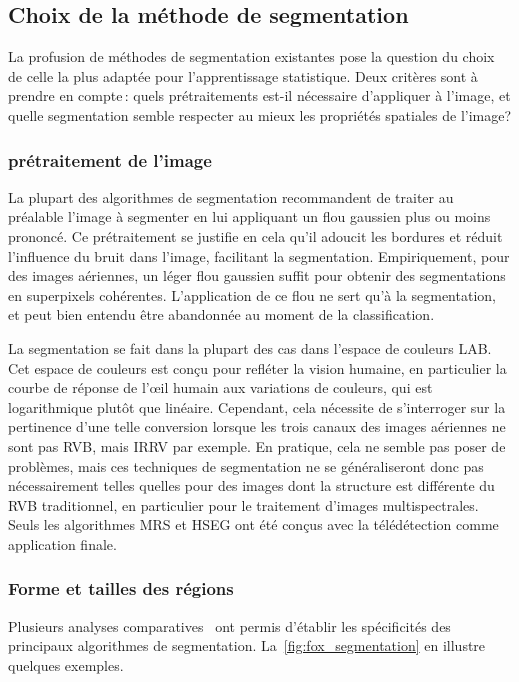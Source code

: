 \subsection{Choix de la méthode de segmentation}

La profusion de méthodes de segmentation existantes pose la question du choix de celle la plus adaptée pour l'apprentissage statistique. Deux critères sont à prendre en compte\,: quels prétraitements est-il nécessaire d'appliquer à l'image, et quelle segmentation semble respecter au mieux les propriétés spatiales de l'image?


\subsubsection{prétraitement de l'image}
La plupart des algorithmes de segmentation recommandent de traiter au préalable l'image à segmenter en lui appliquant un flou gaussien plus ou moins prononcé. Ce prétraitement se justifie en cela qu'il adoucit les bordures et réduit l'influence du bruit dans l'image, facilitant la segmentation. Empiriquement, pour des images aériennes, un léger flou gaussien suffit pour obtenir des segmentations en superpixels cohérentes. L'application de ce flou ne sert qu'à la segmentation, et peut bien entendu être abandonnée au moment de la classification.

La segmentation se fait dans la plupart des cas dans l'espace de couleurs \gls{LAB}. Cet espace de couleurs est conçu pour refléter la vision humaine, en particulier la courbe de réponse de l'\oe{}il humain aux variations de couleurs, qui est logarithmique plutôt que linéaire. Cependant, cela nécessite de s'interroger sur la pertinence d'une telle conversion lorsque les trois canaux des images aériennes ne sont pas \gls{RVB}, mais \gls{IRRV} par exemple. En pratique, cela ne semble pas poser de problèmes, mais ces techniques de segmentation ne se généraliseront donc pas nécessairement telles quelles pour des images dont la structure est différente du \gls{RVB} traditionnel, en particulier pour le traitement d'images multispectrales. Seuls les algorithmes \gls{MRS} et \gls{HSEG} ont été conçus avec la télédétection comme application finale.

\subsubsection{Forme et tailles des régions}

Plusieurs analyses comparatives~\cite{neubert_superpixel_2012,achanta_slic_2012,stutz_superpixels_2018} ont permis d'établir les spécificités des principaux algorithmes de segmentation. La~\cref{fig:fox_segmentation} en illustre quelques exemples.

